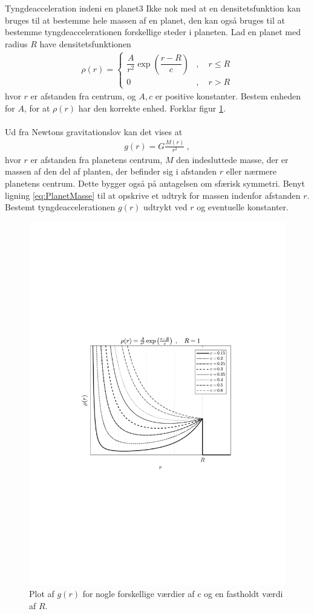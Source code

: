 %
%
\begin{opgave}{Tyngdeacceleration indeni en planet}{3} \label{gPlanet}
Ikke nok med at en densitetsfunktion kan bruges til at bestemme hele massen af en planet, den kan også bruges til at bestemme tyngdeaccelerationen forskellige steder i planeten. Lad en planet med radius $R$ have densitetsfunktionen
\begin{align*}
    \rho(r) = \begin{cases}
               \dfrac{A}{r^2}\exp\left(\dfrac{r-R}{c}\right)&, \quad r\leq R \\[2mm]
                0 &, \quad r>R
                \end{cases}
\end{align*}
hvor $r$ er afstanden fra centrum, og $A,c$ er positive konstanter.
\opg Bestem enheden for $A$, for at $\rho(r)$ har den korrekte enhed.
\opg Forklar figur \ref{fig:PlanetDensitet}. \\ \\
Ud fra Newtons gravitationslov kan det vises at
\begin{align*}
    g(r) = G\frac{M(r)}{r^2} \: ,
\end{align*}
hvor $r$ er afstanden fra planetens centrum, $M$ den indesluttede masse, der er massen af den del af planten, der befinder sig i afstanden $r$ eller nærmere planetens centrum. Dette bygger også på antagelsen om sfærisk symmetri.
\opg Benyt ligning \eqref{eq:PlanetMasse} til at opskrive et udtryk for massen indenfor afstanden $r$.
\opg Bestemt tyngdeaccelerationen $g(r)$ udtrykt ved $r$ og eventuelle konstanter.
\end{opgave}
\begin{figure}[h!]
	\centering
	\includegraphics[trim=4.48cm 9.4cm 4.48cm 9.4cm,width=.9\columnwidth]{Astrofysik/billeder/g_i_planet.pdf}
	\caption{Plot af $g(r)$ for nogle forskellige værdier af $c$ og en fastholdt værdi af $R$.}
	\label{fig:PlanetDensitet}
\end{figure}